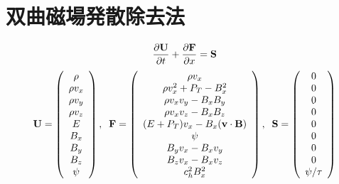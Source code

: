 \section{双曲磁場発散除去法}

\begin{equation}
    \frac{\partial {\bf U}}{\partial t} 
    + \frac{\partial {\bf F}}{\partial x}={\bf S}
\end{equation}
\begin{equation}
    {\bf U} = \left( 
        \begin{array}{c}
            \rho \\
            \rho v_x \\
            \rho v_y \\
            \rho v_z \\
            E\\
            B_x \\
            B_y \\
            B_z \\
            \psi \\
    \end{array}
\right),\;\;
    {\bf F} = \left( 
        \begin{array}{c}
            \rho v_x \\
            \rho v_x^2 + P_T - B_x^2 \\
            \rho v_x v_y  - B_x B_y \\
            \rho v_x v_z  - B_x B_z \\
            (E + P_T)v_x - B_x ({\bf v}\cdot{\bf B}) \\
            \psi \\
            B_y v_x - B_x v_y\\
            B_z v_x - B_x v_z\\
            c_h^2 B_x^2
    \end{array}
\right),\;\;
    {\bf S} = \left( 
        \begin{array}{c}
            0 \\
            0 \\
            0 \\
            0 \\
            0 \\
            0 \\
            0\\
            0\\
            \psi/\tau \\
    \end{array}
    \right)
\end{equation}
